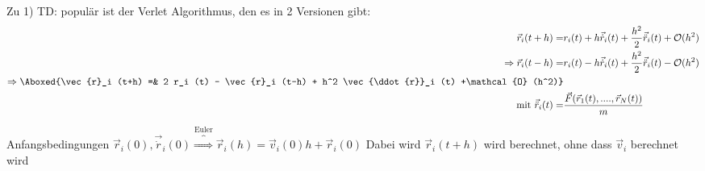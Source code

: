 \documentclass[12pt]{article}
\begin{document}
Zu 1) TD: populär ist der Verlet Algorithmus, den es in 2 Versionen gibt:
\begin{align}
\vec{r}_i (t+h) =& r_i(t) + h \vec{\dot{r}}_i(t) + \frac{h^2}{2} \vec{\ddot{r}}_i(t) + \mathcal{O} (h^2) \\
\Rightarrow \vec{r}_i (t-h) =& r_i (t) - h \vec{\dot{r}}_i (t) + \frac{h^2}{2} \vec{\ddot{r}}_i (t) - \mathcal{O} (h^2) \\
\Rightarrow 
 \Aboxed{\vec{r}_i (t+h) =& 2 r_i (t) - \vec{r}_i (t-h) + h^2 \vec{\ddot{r}}_i (t) +\mathcal{O} (h^2)} \\
 \mbox{mit } \vec{\ddot{r}}_i (t)=& \frac{\vec{F}(\vec{r}_1 (t),...., \vec{r}_N(t))}{m} 
\end{align} 
 
Anfangsbedingungen $ \vec{r}_i (0), \vec{\dot{r}}_i (0) \overbrace{\Rightarrow}^\text{Euler} \vec{r}_i (h) = \vec{v}_i (0) h + \vec{r}_i (0)$
Dabei wird $\vec{r}_i (t+h)$ wird berechnet, ohne dass $\vec{v}_i$ berechnet wird

\end{document}
